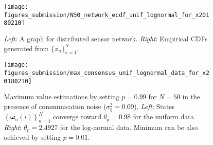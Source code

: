\documentclass[journal]{IEEEtran}
\begin{document}
\begin{figure}
	\centering
	\vspace{-5mm}
	\texttt{[image: figures\_submission/N50\_network\_ecdf\_unif\_lognormal\_for\_x20180210]}
	\vspace{-10mm}
	\caption{\emph{Left}: A graph for distributed sensor network. \emph{Right}: Empirical CDFs generated from $\{x_n\}_{n=1}^{N}$.}
	\vspace{-4mm}
	\label{fig:networkgeneration}
\end{figure}

\begin{figure}
	\centering
	\texttt{[image: figures\_submission/max\_consensus\_unif\_lognormal\_data\_for\_x20180210]}
	\caption{Maximum value estimations by setting $p = 0.99$ for $N=50$ in the presence of communication noise ($\sigma_{\xi}^2 = 0.09$). \emph{Left}: States $\left\{\bm{\omega}_n(i)\right\}_{n=1}^N$ converge toward $\theta_{p} = 0.98$ for the uniform data. \emph{Right}: $\theta_{p} = 2.4927$ for the log-normal data. Minimum can be also achieved by setting $p=0.01$.}
	\vspace{-9mm}
	\label{fig:maxconsensus_unif_lognormal}
\end{figure}


\vspace{-2mm}
\end{document}
